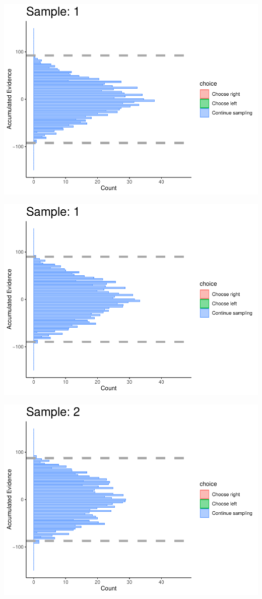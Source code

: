 \documentclass[
]{book}
\begin{document}
\begin{center}\includegraphics[width=0.8\linewidth]{LateNightBayes_files/figure-latex/collapsing_check-8} \end{center}

\begin{center}\includegraphics[width=0.8\linewidth]{LateNightBayes_files/figure-latex/collapsing_check-9} \end{center}

\begin{center}\includegraphics[width=0.8\linewidth]{LateNightBayes_files/figure-latex/collapsing_check-10} \end{center}
\end{document}

